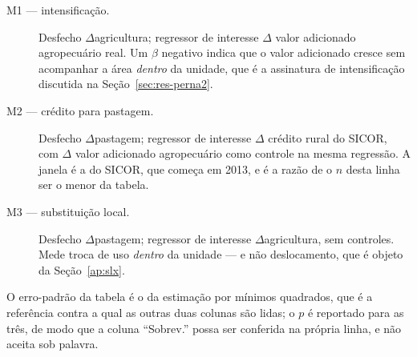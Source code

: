 \begin{description}
\item[M1 --- intensificação.] Desfecho \(\Delta\)agricultura; regressor de
interesse \(\Delta\) valor adicionado agropecuário real. Um \(\beta\) negativo
indica que o valor adicionado cresce sem acompanhar a área \emph{dentro} da
unidade, que é a assinatura de intensificação discutida na
Seção~\ref{sec:res-perna2}.
\item[M2 --- crédito para pastagem.] Desfecho \(\Delta\)pastagem; regressor de
interesse \(\Delta\) crédito rural do SICOR, com \(\Delta\) valor adicionado
agropecuário como controle na mesma regressão. A janela é a do SICOR, que
começa em 2013, e é a razão de o \(n\) desta linha ser o menor da tabela.
\item[M3 --- substituição local.] Desfecho \(\Delta\)pastagem; regressor de
interesse \(\Delta\)agricultura, sem controles. Mede troca de uso \emph{dentro}
da unidade --- e não deslocamento, que é objeto da Seção~\ref{ap:slx}.
\end{description}

O erro-padrão da tabela é o da estimação por mínimos quadrados, que é a
referência contra a qual as outras duas colunas são lidas; o \(p\) é reportado
para as três, de modo que a coluna ``Sobrev.'' possa ser conferida na própria
linha, e não aceita sob palavra.


